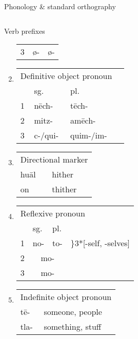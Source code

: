\documentclass[12pt]{beamer}
\newcommand{\nah}[1]{\textcolor{nahgrn}{#1}}
\newcommand{\trs}[1]{\textcolor{nahblu}{#1}}
\begin{document}
\begin{frame}
\begin{columns}[t]
\begin{column}{.22\linewidth}
\begin{block}{Phonology \& standard orthography}
\begin{threeparttable}
\begin{tablenotes}
\begin{frame}
\begin{frame}
\begin{columns}[t]
\begin{column}{0.18\linewidth}
\begin{block}{Verb prefixes}
\begin{enumerate}
\begin{threeparttable}
\begin{tabular}[t]{lll}
              3 & \nah{ø-} & \nah{ø-} \\
            \end{tabular}
          \end{threeparttable}
        \item 
          \begin{tabular}[t]{llll}
            \multicolumn{3}{l}{Definitive object pronoun}\\
            & sg. & pl. \\
            1 & \nah{nēch-} & \nah{tēch-} \\
            2 & \nah{mitz-} & \nah{amēch-}\\
            3 & \nah{c-/qui-} & \nah{quim-/im-} \\
          \end{tabular}
        \item
          \begin{tabular}[t]{ll}
            \multicolumn{2}{l}{Directional marker}\\
            \nah{huāl} & \trs{hither}\\
            \nah{on} & \trs{thither}\\
          \end{tabular}
        \item
          \begin{tabular}[t]{llll}
            \multicolumn{4}{l}{Reflexive pronoun}\\
            & sg. & pl. & \\
            1 & \nah{no-} & \nah{to-}& \trs{\hspace{-1em}\rdelim\}{3}{*}[-self, -selves]}\\
            2 & \multicolumn{2}{c}{\nah{mo-}}  \\
            3 & \multicolumn{2}{c}{\nah{mo-}}  \\
          \end{tabular}
        \item 
          \begin{tabular}[t]{ll}
            \multicolumn{2}{l}{Indefinite object pronoun}\\
            \nah{tē-} & \trs{someone, people}\\
            \nah{tla-} & \trs{something, stuff} \\

\end{tabular}
\end{enumerate}
\end{block}
\end{column}
\end{columns}
\end{frame}
\end{frame}
\end{tablenotes}
\end{threeparttable}
\end{block}
\end{column}
\end{columns}
\end{frame}
\end{document}
